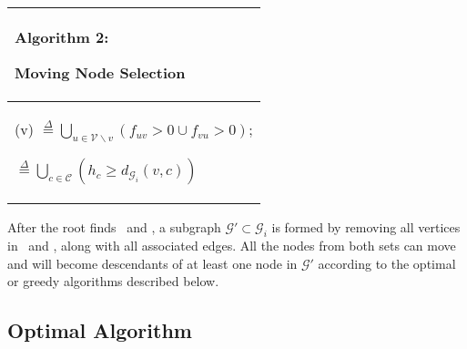 \documentclass[10pt,conference]{IEEEtran}
\begin{document}
\begin{algorithm}[htbp]

\begin{tabular}[c]{p{8cm}}

\hline
{\scriptsize \begin{bf}Algorithm 2: \end{bf} Moving Node Selection }\\
\hline
\SetKwFunction{GC}{GetChildren}
\SetKwFunction{CA}{CheckFlow}
\SetKwFunction{RP}{ReachParentPossible}

{\scriptsize \KwIn{The initial graph, $\mathcal{G}_{i} = \{\mathcal{V},\mathcal{E}_{i}\}$ }
{\scriptsize \KwOut{The active moving set, $\mathcal{A}_M$ and the
    passive moving set, $\mathcal{P}_M$}


\CA(v) $\overset{\Delta}{=} \bigcup_{u \in \mathcal{V} \backslash v} \left( f_{uv} >0 \cup f_{vu} >0 \right)$;

\RP{v,$\mathcal{C}$} $\overset{\Delta}{=} \bigcup_{c \in \mathcal{C}}
\left( h_{c} \geq  d_{\mathcal{G}_{i}}(v,c) \right)$ \;

\ForEach{$v \in \mathcal{V}$}{

\If{($\operatorname{CheckFlow}(v)$ == {\bf true}) $\&\&$ ($h_{v} \geq 1$) }{

$\mathcal{C} =$ \GC{v}\;
\eIf{$\mathcal{C} == \emptyset$}{ $\mathcal{A}_M = \mathcal{A}_M
  \cup v$\; }{
\If{\RP{v,$\mathcal{C}$} == {\bf true} } { $\mathcal{A}_M =
  \mathcal{A}_M \cup v$\;
\ForEach{c $\in$ C}{ \If{\CA{c} == {\bf
false}} { $\mathcal{P}_M = \mathcal{P}_M \cup c$\; } }

}

}

}

}

}

}

\\
\hline


\end{tabular}

\end{algorithm}

After the root finds \AM\ and \PM , a subgraph $\mathcal{G}' \subset
\mathcal{G}_{i}$ is formed by removing all vertices in \AM\ and \PM,
along with all associated edges.  All the nodes from both sets can move
and will become descendants of at least one node in $\mathcal{G}'$
according to the optimal or greedy algorithms described below.


\subsection{Optimal Algorithm}
\label{sec:ea}
\end{document}
